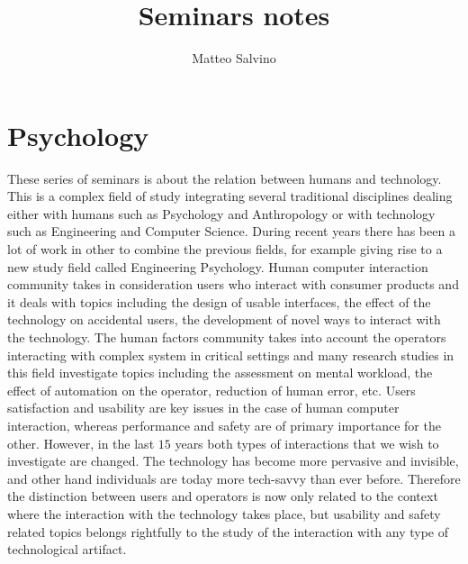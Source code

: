 \documentclass[11pt]{article}
\title{Seminars notes}
\author{Matteo Salvino}
\date{}
\begin{document}
\maketitle
\pagebreak

\tableofcontents
\pagebreak

\section{Psychology}
These series of seminars is about the relation between humans and technology. This is a complex field of study integrating several traditional disciplines dealing either with humans such as Psychology and Anthropology or with technology such as Engineering and Computer Science. During recent years there has been a lot of work in other to combine the previous fields, for example giving rise to a new study field called Engineering Psychology. Human computer interaction community takes in consideration users who interact with consumer products and it deals with topics including the design of usable interfaces, the effect of the technology on accidental users, the development of novel ways to interact with the technology. The human factors community takes into account the operators interacting with complex system in critical settings and many research studies in this field investigate topics including the assessment on mental workload, the effect of automation on the operator, reduction of human error, etc. Users satisfaction and usability are key issues in the case of human computer interaction, whereas performance and safety are of primary importance for the other. However, in the last $15$ years both types of interactions that we wish to investigate are changed. The technology has become more pervasive and invisible, and other hand individuals are today more tech-savvy than ever before. Therefore the distinction between users and operators is now only related to the context where the interaction with the technology takes place, but usability and safety related topics belongs rightfully to the study of the interaction with any type of technological artifact. 
\end{document}
